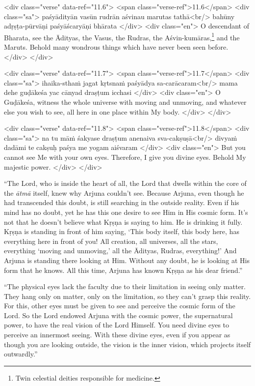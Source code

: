 \begin{html}
<div class="verse" data-ref="11.6">
  <span class="verse-ref">11.6</span>
  <div class="sa">
    paśyādityān vasūn rudrān aśvinau marutas tathā<br/>
    bahūny adṛṣṭa-pūrvāṇi paśyāścaryāṇi bhārata
  </div>
  <div class="en">
    O descendant of Bharata, see the Ādityas, the Vasus, the Rudras, the Aśvin-kumāras,\footnote{Twin celestial deities responsible for medicine.} and the Maruts. Behold many wondrous things which have never been seen before.
  </div>
</div>
\end{html}



\begin{html}
<div class="verse" data-ref="11.7">
  <span class="verse-ref">11.7</span>
  <div class="sa">
    ihaika-sthaṁ jagat kṛtsnaṁ paśyādya sa-carācaram<br/>
    mama dehe guḍākeśa yac cānyad draṣṭum icchasi
  </div>
  <div class="en">
    O Guḍākeśa, witness the whole universe with moving and unmoving, and whatever else you wish to see, all here in one place within My body.
  </div>
</div>
\end{html}



\begin{html}
<div class="verse" data-ref="11.8">
  <span class="verse-ref">11.8</span>
  <div class="sa">
    na tu māṁ śakyase draṣṭum anenaiva sva-cakṣuṣā<br/>
    divyaṁ dadāmi te cakṣuḥ paśya me yogam aiśvaram
  </div>
  <div class="en">
    But you cannot see Me with your own eyes. Therefore, I give you divine eyes. Behold My majestic power.
  </div>
</div>
\end{html}


\enquote{The Lord, who is inside the heart of all, the Lord that dwells within the core of the \textit{ātmā} itself, knew why Arjuna couldn’t see. Because Arjuna, even though he had transcended this doubt, is still searching in the outside reality. Even if his mind has no doubt, yet he has this one desire to see Him in His cosmic form. It’s not that he doesn’t believe what Kṛṣṇa is saying to him. He is drinking it fully. Kṛṣṇa is standing in front of him saying, \enquote{This body itself, this body here, has everything here in front of you! All creation, all universes, all the stars, everything ‘moving and unmoving,’ all the Ādityas, Rudras, everything!} And Arjuna is standing there looking at Him. Without any doubt, he is looking at His form that he knows. All this time, Arjuna has known Kṛṣṇa as his dear friend.}

\enquote{The physical eyes lack the faculty due to their limitation in seeing only matter. They hang only on matter, only on the limitation, so they can’t grasp this reality. For this, other eyes must be given to see and perceive the cosmic form of the Lord. So the Lord endowed Arjuna with the cosmic power, the supernatural power, to have the real vision of the Lord Himself. You need divine eyes to perceive an innermost seeing. With these divine eyes, even if you appear as though you are looking outside, the vision is the inner vision, which projects itself outwardly.}

